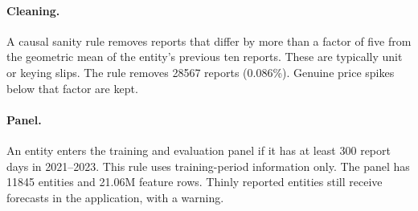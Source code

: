\paragraph{Cleaning.}
A causal sanity rule removes reports that differ by more than a factor of five from the geometric mean of the entity's previous ten reports.
These are typically unit or keying slips.
The rule removes \num{28567} reports (0.086\%).
Genuine price spikes below that factor are kept.

\paragraph{Panel.}
An entity enters the training and evaluation panel if it has at least 300 report days in 2021--2023.
This rule uses training-period information only.
The panel has \num{11845} entities and \num{21.06}M feature rows.
Thinly reported entities still receive forecasts in the application, with a warning.
